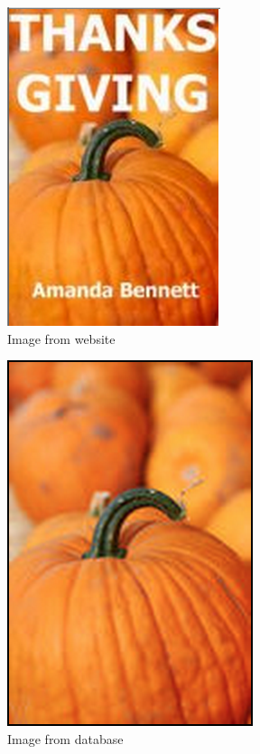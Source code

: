 \documentclass[conference]{IEEEtran}
\begin{document}
\begin{figure}[ht!]
\centering
\includegraphics[width=.4\linewidth]{images/pumpkinSite.png}
\caption{Image from website}
\label{fig:example2.1}
\end{figure}

\begin{figure}[ht!]
\centering
\includegraphics[width=.4\linewidth]{images/pumpkin.png}
\caption{Image from database}
\label{fig:example2.2}
\end{figure}
\end{document}
